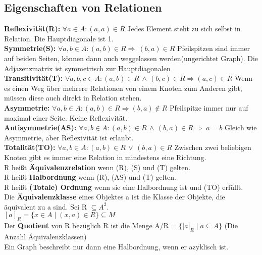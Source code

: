 \documentclass[11pt]{article}
\begin{document}
\subsection{Eigenschaften von Relationen}
{\bfseries Reflexivit{\"a}t(R):} $\forall a \in A\colon (a,a) \in R$ Jedes Element steht zu sich selbst in Relation. Die Hauptdiagonale ist 1. \\
{\bfseries Symmetrie(S):} $\forall a,b \in A\colon (a,b) \in R \Rightarrow\ (b,a) \in R$ Pfeilspitzen sind immer auf beiden Seiten, k{\"o}nnen dann auch weggelassen werden(ungerichtet Graph). Die Adjazenzmatrix ist symmetrisch zur Hauptdiagonalen\\
{\bfseries Transitivit{\"a}t(T):} $\forall a,b,c \in A\colon (a,b) \in R \,\land\, (b,c) \in R \Rightarrow (a,c) \in R$ Wenn es einen Weg {\"u}ber mehrere Relationen von einem Knoten zum Anderen gibt, m{\"u}ssen diese auch direkt in Relation stehen. \\
{\bfseries Asymmetrie:} $\forall a,b \in A\colon (a,b) \in R \Rightarrow (b,a) \notin R$ Pfeilspitze immer nur auf maximal einer Seite. Keine Reflexivit{\"a}t. \\
{\bfseries Antisymmetrie(AS):} $\forall a,b \in A\colon (a,b) \in R \,\land\, (b,a) \in R \Rightarrow\; a = b$ Gleich wie Asymmetrie, aber Reflexivit{\"a}t ist erlaubt. \\
{\bfseries Totalit{\"a}t(TO):} $\forall a,b \in A\colon (a,b) \in R \,\lor\, (b,a) \in R$ Zwischen zwei beliebigen Knoten gibt es immer eine Relation in mindestens eine Richtung.\\
R hei{\ss}t {\bfseries {\"A}quivalenzrelation} wenn (R), (S) und (T) gelten. \\
R hei{\ss}t {\bfseries Halbordnung} wenn (R), (AS) und (T) gelten. \\
R hei{\ss}t {\bfseries (Totale) Ordnung} wenn sie eine Halbordnung ist und (TO) erf{\"u}llt. \\
Die {\bfseries {\"A}quivalenzklasse} eines Objektes a ist die Klasse der Objekte, die {\"a}quivalent zu a sind. Sei R $\subseteq A^2$. \\$[a]_R = \{x\in A\mid (x,a) \in R\} \subseteq M$\\
Der {\bfseries Quotient} von R bez{\"u}glich R ist die Menge A/R = $\{{[}a{[}_R\mid a\subseteq A\}$ (Die Anzahl {\"A}quivalenzklassen)\\
Ein Graph beschreibt nur dann eine Halbordnung, wenn er azyklisch ist.
\end{document}
